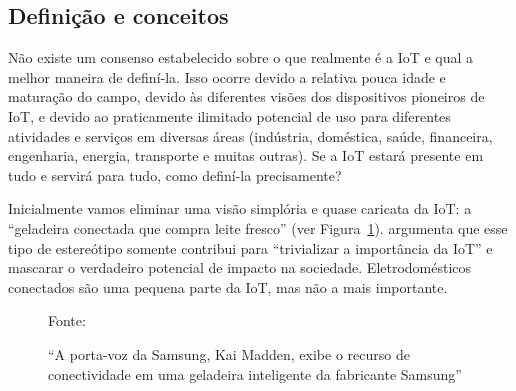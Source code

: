 \documentclass[pdftex, brazil, 12pt, twoside]{article}
\begin{document}
\subsection{Definição e conceitos}
\label{o-que-e-iot-definicao}

Não existe um consenso estabelecido sobre o que realmente é a IoT e qual a melhor
maneira de definí-la. Isso ocorre devido a relativa pouca idade e maturação do
campo, devido às diferentes visões dos dispositivos pioneiros de IoT, e devido
ao praticamente ilimitado potencial de uso para diferentes atividades e serviços
em diversas áreas (indústria, doméstica, saúde, financeira, engenharia,
energia, transporte e muitas
outras). Se a IoT estará presente em tudo e servirá para tudo, como
definí-la precisamente?

Inicialmente vamos eliminar uma visão simplória e quase caricata da IoT: a
``geladeira conectada que compra leite fresco'' (ver Figura~\ref{fig:smart-geladeira}).
\citet[][p.\ 6]{UKGOSWalportIoT2014}
argumenta que esse tipo de estereótipo somente contribui para ``trivializar
a importância da IoT'' e mascarar o verdadeiro potencial de impacto na sociedade.
Eletrodomésticos conectados são uma pequena parte da IoT, mas não a mais
importante.

\begin{figure}[h]
  \begin{center}
    \caption{``A porta-voz da Samsung, Kai Madden, exibe o recurso de conectividade em
      uma geladeira inteligente da fabricante Samsung''~\citep{BajarinIoE2014}}
    \label{fig:smart-geladeira}

    \footnotesize{Fonte:~\citet{BajarinIoE2014}}%
  \end{center}
\end{figure}
\end{document}
